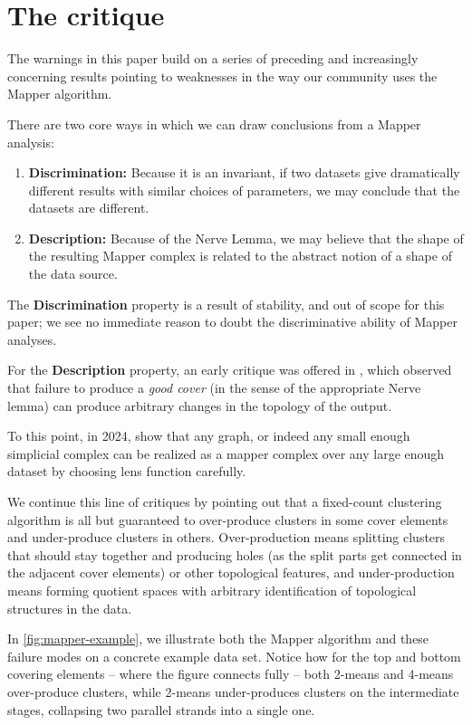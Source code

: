 \documentclass{amsart}
\begin{document}
\section{The critique}

The warnings in this paper build on a series of preceding and increasingly concerning results pointing to weaknesses in the way our community uses the Mapper algorithm.

There are two core ways in which we can draw conclusions from a Mapper analysis:
\begin{enumerate}
    \item \textbf{Discrimination:} Because it is an invariant, if two datasets give dramatically different results with similar choices of parameters, we may conclude that the datasets are different.
    \item \textbf{Description:} Because of the Nerve Lemma, we may believe that the shape of the resulting Mapper complex is related to the abstract notion of a shape of the data source.
\end{enumerate}

The \textbf{Discrimination} property is a result of stability, and out of scope for this paper; we see no immediate reason to doubt the discriminative ability of Mapper analyses.

For the \textbf{Description} property, an early critique was offered in \cite{vejdemo2020certified}, which observed that failure to produce a \emph{good cover} (in the sense of the appropriate Nerve lemma) can produce arbitrary changes in the topology of the output.

To this point, in 2024, \cite{alvarado2024graphmappergraph} show that any graph, or indeed any small enough simplicial complex can be realized as a mapper complex over any large enough dataset by choosing lens function carefully.

We continue this line of critiques by pointing out that a fixed-count clustering algorithm is all but guaranteed to over-produce clusters in some cover elements and under-produce clusters in others. Over-production means splitting clusters that should stay together and producing holes (as the split parts get connected in the adjacent cover elements) or other topological features, and under-production means forming quotient spaces with arbitrary identification of topological structures in the data.

In \cref{fig:mapper-example}, we illustrate both the Mapper algorithm and these failure modes on a concrete example data set. Notice how for the top and bottom covering elements -- where the figure connects fully -- both 2-means and 4-means over-produce clusters, while 2-means under-produces clusters on the intermediate stages, collapsing two parallel strands into a single one.
\end{document}
